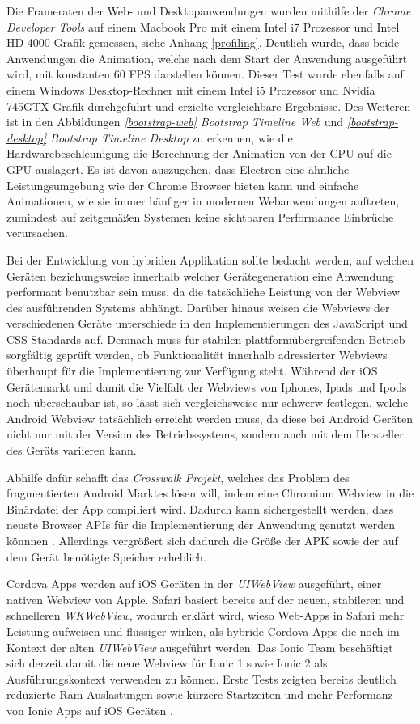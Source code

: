 Die Frameraten der Web- und Desktopanwendungen wurden mithilfe der
\emph{Chrome Developer Tools} auf einem Macbook Pro mit einem Intel i7 Prozessor und Intel HD 4000 Grafik gemessen,
siehe Anhang \ref{profiling}.
Deutlich wurde, dass beide Anwendungen die Animation, welche nach dem Start der Anwendung ausgeführt wird,
mit konstanten 60 FPS darstellen können. Dieser Test wurde ebenfalls auf einem Windows Desktop-Rechner mit einem Intel i5 Prozessor und Nvidia 745GTX Grafik durchgeführt und
erzielte vergleichbare Ergebnisse. Des Weiteren ist in den Abbildungen \emph{\ref{bootstrap-web} Bootstrap Timeline Web} und \emph{\ref{bootstrap-desktop} Bootstrap Timeline Desktop} zu erkennen,
wie die Hardwarebeschleunigung die Berechnung der Animation von der CPU auf die GPU auslagert.
Es ist davon auszugehen, dass Electron eine ähnliche Leistungsumgebung wie der Chrome Browser bieten kann und
einfache Animationen, wie sie immer häufiger in modernen Webanwendungen auftreten, zumindest auf zeitgemäßen Systemen keine
sichtbaren Performance Einbrüche verursachen.

Bei der Entwicklung von hybriden Applikation sollte bedacht werden,
auf welchen Geräten beziehungsweise innerhalb welcher Gerätegeneration eine Anwendung performant benutzbar sein muss,
da die tatsächliche Leistung von der Webview des ausführenden Systems abhängt.
Darüber hinaus weisen die Webviews der verschiedenen Geräte unterschiede in den Implementierungen
des JavaScript und \ac{CSS} Standards auf. Demnach muss für stabilen plattformübergreifenden Betrieb sorgfältig geprüft werden,
ob Funktionalität innerhalb adressierter Webviews überhaupt für die Implementierung zur Verfügung steht.
Während der iOS Gerätemarkt und damit die Vielfalt der Webviews von Iphones, Ipads und Ipods noch überschaubar ist,
so lässt sich vergleichsweise nur schwerw festlegen, welche Android Webview tatsächlich erreicht werden muss,
da diese bei Android Geräten nicht nur mit der Version des Betriebssystems, sondern auch mit dem Hersteller des Geräts variieren kann.

Abhilfe dafür schafft das \emph{Crosswalk Projekt}, welches das Problem des fragmentierten Android Marktes lösen will,
indem eine Chromium Webview in die Binärdatei der App compiliert wird. Dadurch kann sichergestellt werden,
dass neuste Browser APIs für die Implementierung der Anwendung genutzt werden könnnen \cite{Cross69:online}.
Allerdings vergrößert sich dadurch die Größe der \ac{APK} sowie der auf dem Gerät benötigte Speicher erheblich.

Cordova Apps werden auf iOS Geräten in der \emph{UIWebView} ausgeführt, einer nativen Webview von Apple. Safari basiert bereits
auf der neuen, stabileren und schnelleren \emph{WKWebView}, wodurch erklärt wird, wieso Web-Apps in Safari
mehr Leistung aufweisen und flüssiger wirken, als hybride Cordova Apps die noch im Kontext der alten \emph{UIWebView} ausgeführt werden.
Das Ionic Team beschäftigt sich derzeit damit die neue Webview für Ionic 1 sowie Ionic 2 als Ausführungskontext verwenden zu können.
Erste Tests zeigten bereits deutlich reduzierte Ram-Auslastungen sowie kürzere Startzeiten und mehr Performanz von Ionic Apps auf iOS Geräten \cite{Cordo84:online}.


